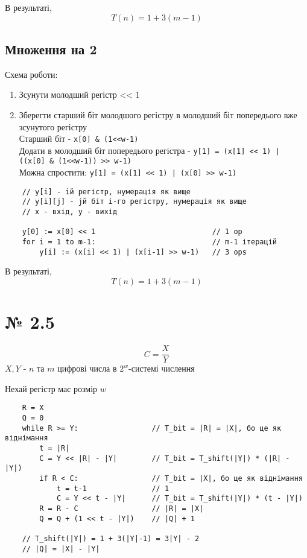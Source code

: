 \documentclass[11pt, a4paper]{article} %
\begin{document}
В результаті, $$T(n) = 1 + 3(m-1)$$

\subsection*{Множення на 2}
Схема роботи:
\begin{enumerate}
    \item Зсунути молодший регістр << 1
    \item Зберегти старший біт молодшого регістру в молодший біт попередього вже зсунутого регістру\\
    Старший біт - \texttt{x[0] \& (1<<w-1)}\\
    Додати в молодший біт попередього регістра - \texttt{y[1] = (x[1] << 1) | ((x[0] \& (1<<w-1)) >> w-1)}\\
    Можна спростити: \texttt{y[1] = (x[1] << 1) | (x[0] >> w-1)}
\end{enumerate}

\begin{lstlisting}
    // y[i] - iй регістр, нумерація як вище
    // y[i][j] - jй біт i-го регістру, нумерація як вище
    // x - вхід, y - вихід

    y[0] := x[0] << 1                           // 1 op
    for i = 1 to m-1:                           // m-1 ітерацій
        y[i] := (x[i] << 1) | (x[i-1] >> w-1)   // 3 ops
\end{lstlisting}

В результаті, $$T(n) = 1 + 3(m-1)$$

\pagebreak

\section*{№ 2.5}
$$C = \frac{X}{Y}$$
$X, Y$ - $n$ та $m$ цифрові числа в $2^w$-системі числення

Нехай регістр має розмір $w$

\begin{lstlisting}
    R = X
    Q = 0
    while R >= Y:                 // T_bit = |R| = |X|, бо це як віднімання
        t = |R|
        C = Y << |R| - |Y|        // T_bit = T_shift(|Y|) * (|R| - |Y|)
        if R < C:                 // T_bit = |X|, бо це як віднімання
            t = t-1               // 1
            C = Y << t - |Y|      // T_bit = T_shift(|Y|) * (t - |Y|)
        R = R - C                 // |R| = |X|
        Q = Q + (1 << t - |Y|)    // |Q| + 1
    
    // T_shift(|Y|) = 1 + 3(|Y|-1) = 3|Y| - 2
    // |Q| = |X| - |Y|
\end{lstlisting}
\end{document}
